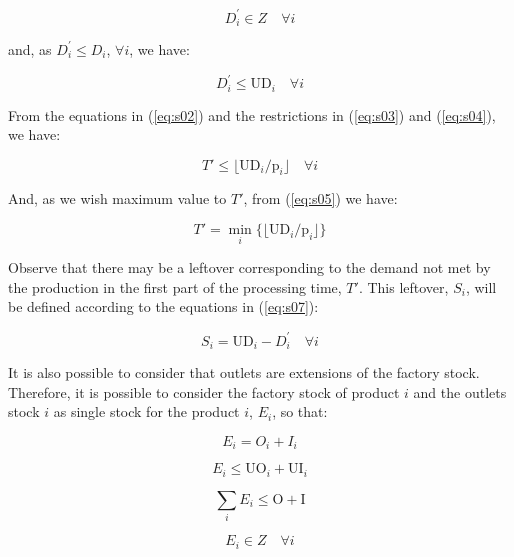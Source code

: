 \documentclass[10pt,fleqn,a4paper,twoside]{article}
\begin{document}
\begin{equation}
\label{eq:s03}
D_{i}^{'} \in Z \quad \forall i
\end{equation}

\noindent and, as $D_{i}^{'} \leq D_i$, $\forall i$, we have:

\begin{equation}
\label{eq:s04}
D_{i}^{'} \leq \textrm{UD}_i\quad \forall i
\end{equation}

From the equations in (\ref{eq:s02}) and the restrictions in (\ref{eq:s03}) and (\ref{eq:s04}), we have:

\begin{equation}
\label{eq:s05}
T' \leq \lfloor{\textrm{UD}_i / \textrm{p}_i}\rfloor \quad \forall i
\end{equation}

And, as we wish maximum value to $T'$, from (\ref{eq:s05}) we have:

\begin{equation}
\label{eq:s06}
T' = \min_i\{\lfloor{\textrm{UD}_i / \textrm{p}_i}\rfloor\}
\end{equation}

Observe that there may be a leftover corresponding to the demand not met by the production in the first part of the processing time, $T'$. This leftover, $S_i$, will be defined according to the equations in (\ref{eq:s07}):

\begin{equation}
\label{eq:s07}
S_i = \textrm{UD}_i - D_{i}^{'} \quad \forall i
\end{equation}

It is also possible to consider that outlets are extensions of the factory stock. Therefore, it is possible to consider the factory stock of product $i$ and the outlets stock $i$ as single stock for the product $i$, $E_i$, so that:

\begin{equation}
\label{eq:s08}
E_i = O_i + I_i
\end{equation}

\begin{equation}
\label{eq:s09}
E_i \leq \textrm{UO}_i + \textrm{UI}_i
\end{equation}

\begin{equation}
\label{eq:s10}
\sum_i {E_i} \leq \textrm{O} + \textrm{I}
\end{equation}

\begin{equation}
\label{eq:s11}
E_i \in Z \quad \forall i
\end{equation}
\end{document}
